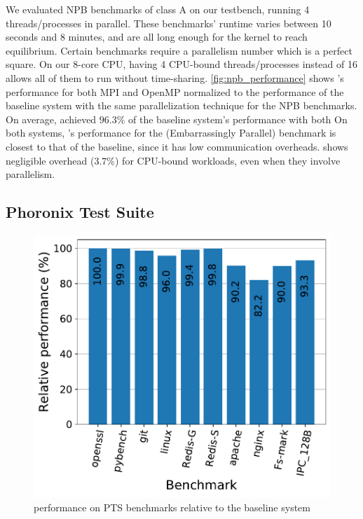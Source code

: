 \documentclass[letterpaper,twocolumn,10pt, anonymous]{article}
\begin{document}
We evaluated NPB benchmarks of class A on our testbench, running 
4 threads/processes in parallel.
These benchmarks' runtime varies between 10 seconds and 8 minutes, 
and are all long enough for the kernel to reach equilibrium.
Certain benchmarks require a parallelism number which is a perfect square.
On our 8-core CPU, having 4 CPU-bound threads/processes instead of 16 allows 
all of them to run without time-sharing.
\autoref{fig:npb_performance} shows \tiktok's performance for both MPI and OpenMP 
normalized to the performance of the baseline system with the same parallelization
technique for the NPB benchmarks.
On average, \tiktok achieved $96.3\%$ of the baseline system's performance with 
both 
On both systems, \tiktok's performance for the  (Embarrassingly Parallel)
benchmark is closest to that of the baseline, since it has low 
communication overheads.
\tiktok shows negligible overhead ($3.7\%$) for CPU-bound workloads, even when they 
involve parallelism.


\subsection{Phoronix Test Suite}

\begin{figure}[]
  \includegraphics[width=\linewidth]{img/pts_performance.pdf}
  \caption{\tiktok performance on PTS benchmarks relative to the baseline system}
  \label{fig:pts_performance}
\end{figure}
\end{document}
